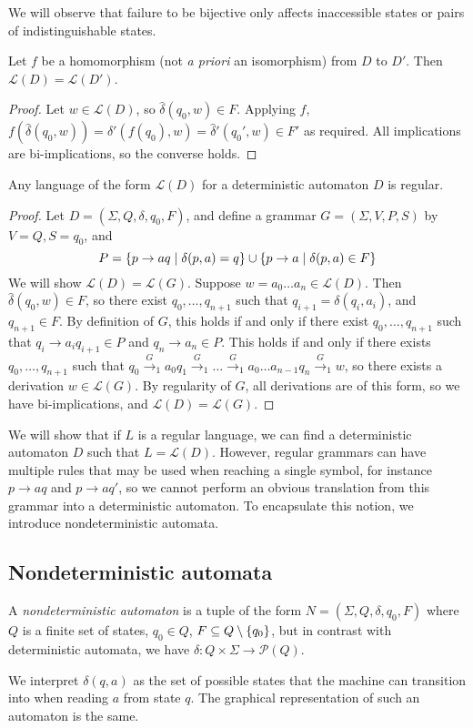 We will observe that failure to be bijective only affects inaccessible states or pairs of indistinguishable states.
\begin{proposition}
	Let \( f \) be a homomorphism (not \emph{a priori} an isomorphism) from \( D \) to \( D' \).
	Then \( \mathcal L(D) = \mathcal L(D') \).
\end{proposition}
\begin{proof}
	Let \( w \in \mathcal L(D) \), so \( \hat\delta(q_0,w) \in F \).
	Applying \( f \), \( f(\hat\delta(q_0,w)) = \hat\delta'(f(q_0),w) = \hat\delta'(q_0',w) \in F' \) as required.
	All implications are bi-implications, so the converse holds.
\end{proof}
\begin{theorem}
	Any language of the form \( \mathcal L(D) \) for a deterministic automaton \( D \) is regular.
\end{theorem}
\begin{proof}
	Let \( D = (\Sigma, Q, \delta, q_0, F) \), and define a grammar \( G = (\Sigma, V, P, S) \) by \( V = Q, S = q_0 \), and
	\[ P = \qty{p \to aq \mid \delta(p, a) = q} \cup \qty{p \to a \mid \delta(p,a) \in F} \]
	We will show \( \mathcal L(D) = \mathcal L(G) \).
	Suppose \( w = a_0\dots a_n \in \mathcal L(D) \).
	Then \( \hat \delta(q_0,w) \in F \), so there exist \( q_0, \dots, q_{n+1} \) such that \( q_{i+1} = \delta(q_i, a_i) \), and \( q_{n+1} \in F \).
	By definition of \( G \), this holds if and only if there exist \( q_0, \dots, q_{n+1} \) such that \( q_i \to a_i q_{i+1} \in P \) and \( q_n \to a_n \in P \).
	This holds if and only if there exists \( q_0, \dots, q_{n+1} \) such that \( q_0 \xrightarrow G_1 a_0 q_1 \xrightarrow G_1 \dots \xrightarrow G_1 a_0 \dots a_{n-1} q_n \xrightarrow G_1 w \), so there exists a derivation \( w \in \mathcal L(G) \).
	By regularity of \( G \), all derivations are of this form, so we have bi-implications, and \( \mathcal L(D) = \mathcal L(G) \).
\end{proof}
We will show that if \( L \) is a regular language, we can find a deterministic automaton \( D \) such that \( L = \mathcal L(D) \).
However, regular grammars can have multiple rules that may be used when reaching a single symbol, for instance \( p \to aq \) and \( p \to aq' \), so we cannot perform an obvious translation from this grammar into a deterministic automaton.
To encapsulate this notion, we introduce nondeterministic automata.

\subsection{Nondeterministic automata}
\begin{definition}
	A \emph{nondeterministic automaton} is a tuple of the form \( N = (\Sigma, Q, \delta, q_0, F) \) where \( Q \) is a finite set of states, \( q_0 \in Q \), \( F \subseteq Q \setminus \qty{q_0} \), but in contrast with deterministic automata, we have \( \delta \colon Q \times \Sigma \to \mathcal P(Q) \).
\end{definition}
We interpret \( \delta(q,a) \) as the set of possible states that the machine can transition into when reading \( a \) from state \( q \).
The graphical representation of such an automaton is the same.

